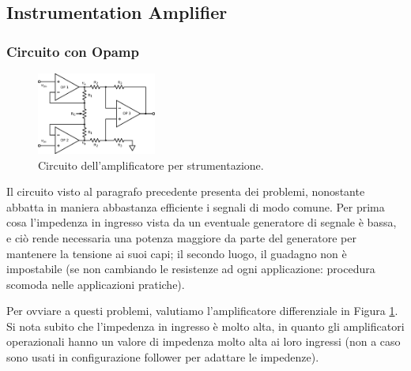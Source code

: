 \subsection{Instrumentation Amplifier}

\subsubsection{Circuito con Opamp}

\begin{figure}
  \begin{center}
    \includegraphics[width=0.350\textwidth]{../E05/latex/c_INA.pdf}
  \end{center}
  \caption{Circuito dell'amplificatore per strumentazione.}
  \label{cir5:instr_amplif}
\end{figure}

Il circuito visto al paragrafo precedente presenta dei problemi, nonostante abbatta in maniera abbastanza efficiente i segnali di modo comune. Per prima cosa l'impedenza in ingresso vista da un eventuale generatore di segnale è bassa, e ciò rende necessaria una potenza maggiore da parte del generatore per mantenere la tensione ai suoi capi; il secondo luogo, il guadagno non è impostabile (se non cambiando le resistenze ad ogni applicazione: procedura scomoda nelle applicazioni pratiche).

Per ovviare a questi problemi, valutiamo l'amplificatore differenziale in Figura \ref{cir5:instr_amplif}. Si nota subito che l'impedenza in ingresso è molto alta, in quanto gli amplificatori operazionali hanno un valore di impedenza molto alta ai loro ingressi (non a caso sono usati in configurazione follower per adattare le impedenze).

